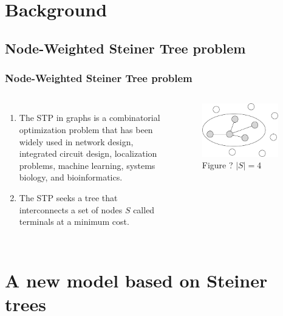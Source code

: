 \documentclass[aspectratio=169]{beamer}
\begin{document}
\section[Background]{Background}
\subsection[STP]{Node-Weighted Steiner Tree problem}

\begin{frame}
\frametitle{Node-Weighted Steiner Tree problem}
  \begin{columns}
    \begin{enumerate}
      \item The STP in graphs is a combinatorial optimization problem that has been widely used in network design, integrated circuit design, localization problems, machine learning, systems biology, and bioinformatics\cite{ljubic2021solving}.
      \item The STP seeks a tree that interconnects a set of nodes $S$ called terminals at a minimum cost.
    \end{enumerate}
    \begin{figure}[ht]
      \centering
      \includegraphics[width=0.9\textwidth]{images/STP.pdf}
      \caption{\footnotesize Figure ? $|S| = 4$}
    \end{figure}
  \end{columns}
\end{frame}

\section[A new model based on Steiner trees]{A new model based on Steiner trees}
\end{document}
